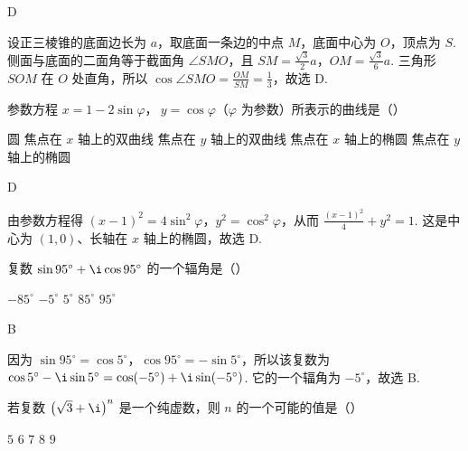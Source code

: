 \begin{answer}
D
\end{answer}

\begin{solution}
设正三棱锥的底面边长为 \(a\)，取底面一条边的中点 \(M\)，底面中心为 \(O\)，顶点为 \(S\). 侧面与底面的二面角等于截面角 \(\angle SMO\)，且 \(SM=\frac{\sqrt{3}}{2}a\)，\(OM=\frac{\sqrt{3}}{6}a\). 三角形 \(SOM\) 在 \(O\) 处直角，所以 \(\cos\angle SMO=\frac{OM}{SM}=\frac{1}{3}\)，故选 D.
\end{solution}

\begin{problem}

参数方程 \(x = 1 - 2\sin\varphi\)，\(\ y = \cos\varphi\)（\(\varphi \) 为参数）所表示的曲线是（\quad）

\choicesfive
    {圆}
    {焦点在 \(x\) 轴上的双曲线}
    {焦点在 \(y\) 轴上的双曲线}
    {焦点在 \(x\) 轴上的椭圆}
    {焦点在 \(y\) 轴上的椭圆}
\end{problem}

\begin{answer}
D
\end{answer}

\begin{solution}
由参数方程得 \((x-1)^2=4\sin^2\varphi\)，\(y^2=\cos^2\varphi\)，从而 \(\frac{(x-1)^2}{4}+y^2=1\). 这是中心为 \((1,0)\)、长轴在 \(x\) 轴上的椭圆，故选 D.
\end{solution}

\begin{problem}

复数 \(\sin95^{\circ}+\i\cos95^{\circ} \) 的一个辐角是（\quad）

\choicesfive
    {\(-85^{\circ} \)}
    {\(-5^{\circ} \)}
    {\(5^{\circ} \)}
    {\(85^{\circ} \)}
    {\(95^{\circ} \)}
\end{problem}

\begin{answer}
B
\end{answer}

\begin{solution}
因为 \(\sin95^{\circ}=\cos5^{\circ}\)，\(\cos95^{\circ}=-\sin5^{\circ}\)，所以该复数为 \(\cos5^{\circ}-\i\sin5^{\circ}=\cos(-5^{\circ})+\i\sin(-5^{\circ})\). 它的一个辐角为 \(-5^{\circ}\)，故选 B.
\end{solution}

\begin{problem}

若复数 \(\left(\sqrt{3} + \i\right)^{n} \) 是一个纯虚数，则 \(n\) 的一个可能的值是（\quad）

\choicesfive
    {\(5\)}
    {\(6\)}
    {\(7\)}
    {\(8\)}
    {\(9\)}
\end{problem}

